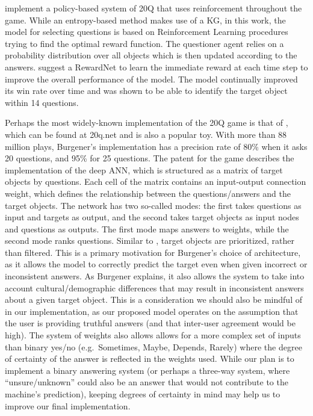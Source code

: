 \documentclass[a4paper,12pt]{article}
\begin{document}
\citet{HuEa2018} implement a policy-based system of 20Q that uses reinforcement throughout the game. 
While an entropy-based method makes use of a KG, in this work, the model for selecting questions is based on Reinforcement Learning procedures trying to find the optimal reward function. 
The questioner agent relies on a probability distribution over all objects which is then updated according to the answers.
\citet{HuEa2018} suggest a RewardNet to learn the immediate reward at each time step to improve the overall performance of the model. 
The model continually improved its win rate over time and was shown to be able to identify the target object within 14 questions.

Perhaps the most widely-known implementation of the 20Q game is that of \citet{Burgener2006}, which can be found at 20q.net and is also a popular toy. 
With more than 88 million plays, Burgener’s implementation has a precision rate of 80\% when it asks 20 questions, and 95\% for 25 questions. 
The patent for the game describes the implementation of the deep ANN, which is structured as a matrix of target objects by questions. 
Each cell of the matrix contains an input-output connection weight, which defines the relationship between the questions/answers and the target objects. 
The network has two so-called modes: the first takes questions as input and targets as output, and the second takes target objects as input nodes and questions as outputs. 
The first mode maps answers to weights, while the second mode ranks questions. 
Similar to \citet{DeyEa2019}, target objects are prioritized, rather than filtered. 
This is a primary motivation for Burgener’s choice of architecture, as it allows the model to correctly predict the target even when given incorrect or inconsistent answers. 
As Burgener explains, it also allows the system to take into account cultural/demographic differences that may result in inconsistent answers about a given target object. 
This is a consideration we should also be mindful of in our implementation, as our proposed model operates on the assumption that the user is providing truthful answers (and that inter-user agreement would be high). 
The system of weights also allows allows for a more complex set of inputs than binary yes/no (e.g.\ Sometimes, Maybe, Depends, Rarely) where the degree of certainty of the answer is reflected in the weights used. 
While our plan is to implement a binary answering system (or perhaps a three-way system, where ``unsure/unknown'' could also be an answer that would not contribute to the machine’s prediction), keeping degrees of certainty in mind may help us to improve our final implementation.
\end{document}
